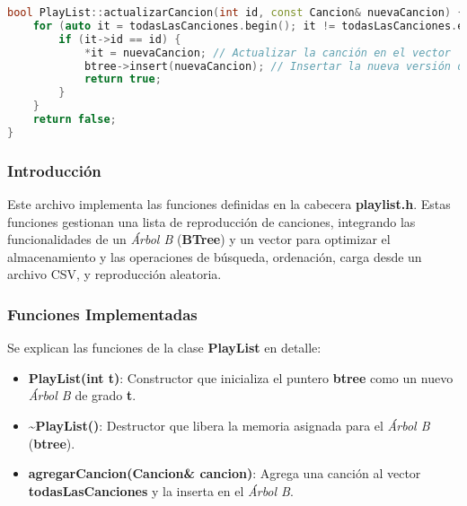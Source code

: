 \documentclass[12pt]{article}
\begin{document}
\begin{flushleft}
\begin{lstlisting}[language=C++, style=mystyle, caption={Código de la Clase Playlist}]
bool PlayList::actualizarCancion(int id, const Cancion& nuevaCancion) {
    for (auto it = todasLasCanciones.begin(); it != todasLasCanciones.end(); ++it) {
        if (it->id == id) {
            *it = nuevaCancion; // Actualizar la canción en el vector
            btree->insert(nuevaCancion); // Insertar la nueva versión de la canción en el B-Tree
            return true;
        }
    }
    return false;
}
            \end{lstlisting}

            \subsubsection{Introducción}

                \noindent\hspace*{4em}Este archivo implementa las funciones definidas en la cabecera \textbf{playlist.h}. Estas funciones gestionan una lista de reproducción de canciones, integrando las funcionalidades de un \textit{Árbol B} (\textbf{BTree}) y un vector para optimizar el almacenamiento y las operaciones de búsqueda, ordenación, carga desde un archivo CSV, y reproducción aleatoria.
                
            \subsubsection{Funciones Implementadas}
            
                \noindent\hspace*{4em}Se explican las funciones de la clase \textbf{PlayList} en detalle:
                
                \begin{itemize}[left=4em]
                
                    \item \textbf{PlayList(int t)}: Constructor que inicializa el puntero \textbf{btree} como un nuevo \textit{Árbol B} de grado \textbf{t}.
                    
                    \item \textbf{\textasciitilde PlayList()}: Destructor que libera la memoria asignada para el \textit{Árbol B} (\textbf{btree}).
                
                    \item \textbf{agregarCancion(Cancion\& cancion)}: Agrega una canción al vector \textbf{todasLasCanciones} y la inserta en el \textit{Árbol B}.
                    

\end{itemize}
\end{flushleft}
\end{document}
